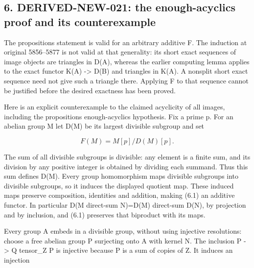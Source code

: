 \documentclass[11pt]{article}
\begin{document}
\subsection{\texorpdfstring{6. DERIVED-NEW-021:\allowbreak{} the enough-acyclics proof and its counterexample}{6.  the enough-acyclics proof and its counterexample}}\label{proofs-5091-5900-derived-new-021-the-enough-acyclics-proof-and-its-counterexample}

The proposition\textquotesingle s statement is valid for an arbitrary additive F. The induction at original 5856–\allowbreak{}5877 is not valid at that generality:\allowbreak{} its short exact sequences of image objects are triangles in D(A)\allowbreak{},\allowbreak{} whereas the earlier computing lemma applies to the exact functor K(A)\allowbreak{} \allowbreak{}-> D(B)\allowbreak{} and triangles in K(A)\allowbreak{}. A nonsplit short exact sequence need not give such a triangle there. Applying F to that sequence cannot be justified before the desired exactness has been proved.

Here is an explicit counterexample to the claimed acyclicity of all images,\allowbreak{} including the proposition\textquotesingle s enough-acyclics hypothesis. Fix a prime p. For an abelian group M let D(M)\allowbreak{} be its largest divisible subgroup and set

\[
 F(M)=M[p]/D(M)[p].                                      \tag{6.1}
\]

The sum of all divisible subgroups is divisible:\allowbreak{} any element is a finite sum,\allowbreak{} and its division by any positive integer is obtained by dividing each summand. Thus this sum defines D(M)\allowbreak{}. Every group homomorphism maps divisible subgroups into divisible subgroups,\allowbreak{} so it induces the displayed quotient map. These induced maps preserve composition,\allowbreak{} identities and addition,\allowbreak{} making (6.1)\allowbreak{} an additive functor. In particular D(M direct-sum N)\allowbreak{}\allowbreak{}=D(M)\allowbreak{} direct-sum D(N)\allowbreak{},\allowbreak{} by projection and by inclusion,\allowbreak{} and (6.1)\allowbreak{} preserves that biproduct with its maps.

Every group A embeds in a divisible group,\allowbreak{} without using injective resolutions:\allowbreak{} choose a free abelian group P surjecting onto A with kernel N. The inclusion P \allowbreak{}-> Q tensor\_\allowbreak{}Z P is injective because P is a sum of copies of Z. It induces an injection
\end{document}
